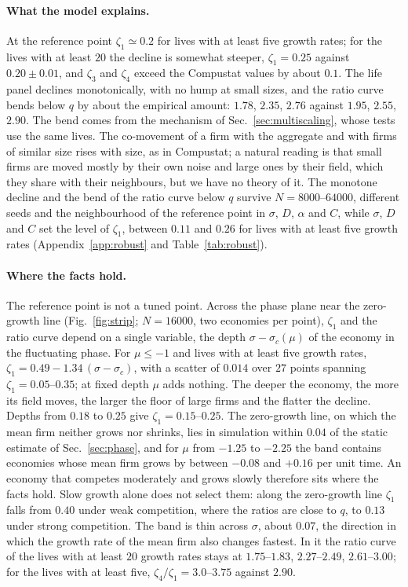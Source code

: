 \documentclass[pre,twocolumn,superscriptaddress,nofootinbib]{revtex4-2}
\begin{document}
\paragraph{What the model explains.}  At the reference point $\zeta_1\simeq0.2$ for lives with at least five growth
rates; for the lives with at least $20$ the decline is somewhat steeper, $\zeta_1=0.25$ against $0.20\pm0.01$, and
$\zeta_3$ and $\zeta_4$ exceed the Compustat values by about $0.1$.  The life panel declines monotonically, with no hump at small sizes, and the ratio curve bends
below $q$ by about the empirical amount: $1.78$, $2.35$, $2.76$ against $1.95$, $2.55$, $2.90$.
The bend comes from the mechanism of Sec.~\ref{sec:multiscaling}, whose tests use the same lives.  The co-movement of a firm with the
aggregate and with firms of similar size rises with size, as in Compustat; a natural reading is that
small firms are moved mostly by their own noise and large ones by their field, which they share with
their neighbours, but we have no theory of it.  The monotone decline and the bend of the ratio curve below $q$ survive
$N=8000$--$64000$, different seeds and the neighbourhood of the reference point in $\sigma$, $D$, $\alpha$
and $C$, while $\sigma$, $D$ and $C$ set the level of $\zeta_1$, between $0.11$ and $0.26$ for lives with at least
five growth rates (Appendix~\ref{app:robust} and Table~\ref{tab:robust}).

\paragraph{Where the facts hold.}  The reference point is not a tuned point.  Across the phase plane near the
zero-growth line (Fig.~\ref{fig:strip}; $N=16000$, two economies per point), $\zeta_1$ and the ratio curve depend on a
single variable, the depth $\sigma-\sigma_c(\mu)$ of the economy in the fluctuating phase.  For $\mu\le-1$ and lives with at
least five growth rates, $\zeta_1=0.49-1.34\,(\sigma-\sigma_c)$, with a scatter of $0.014$ over $27$ points spanning
$\zeta_1=0.05$--$0.35$; at fixed depth $\mu$ adds nothing.  The deeper the economy, the more its field moves, the larger
the floor of large firms and the flatter the decline.  Depths from $0.18$ to $0.25$ give $\zeta_1=0.15$--$0.25$.  The
zero-growth line, on which the mean firm neither grows nor shrinks, lies in simulation within $0.04$ of the static
estimate of Sec.~\ref{sec:phase}, and for $\mu$ from $-1.25$ to $-2.25$ the band contains economies whose mean firm grows
by between $-0.08$ and $+0.16$ per unit time.  An economy that competes moderately and grows slowly therefore sits
where the facts hold.  Slow growth alone does not select them: along the zero-growth line $\zeta_1$ falls from $0.40$
under weak competition, where the ratios are close to $q$, to $0.13$ under strong competition.  The band is thin
across $\sigma$, about $0.07$, the direction in which the growth rate of the mean firm also changes fastest.  In it the
ratio curve of the lives with at least $20$ growth rates stays at $1.75$--$1.83$, $2.27$--$2.49$, $2.61$--$3.00$; for the
lives with at least five, $\zeta_4/\zeta_1=3.0$--$3.75$ against $2.90$.
\end{document}
